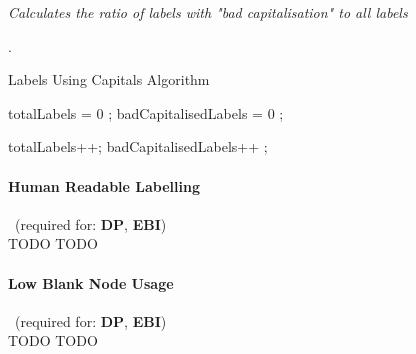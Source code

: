 \begin{mdframed}[style=metricdefinition]
\emph{Calculates the ratio of labels with "bad capitalisation" to all labels}
\end{mdframed}
.

\begin{algorithm}
\caption{Labels Using Capitals Algorithm}\label{lst:badCapitals}
\begin{algorithmic}[1]
\State totalLabels = 0 ;
\State badCapitalisedLabels = 0 ;
\EndProcedure

 totalLabels++; \EndIf
{}badCapitalisedLabels++ ; \EndIf
{}
\EndProcedure
\end{algorithmic}
\end{algorithm}

\paragraph{Human Readable Labelling}~(required for: \textbf{DP}, \textbf{EBI})~\\
TODO TODO

\paragraph{Low Blank Node Usage}~(required for: \textbf{DP}, \textbf{EBI})~\\
TODO TODO



